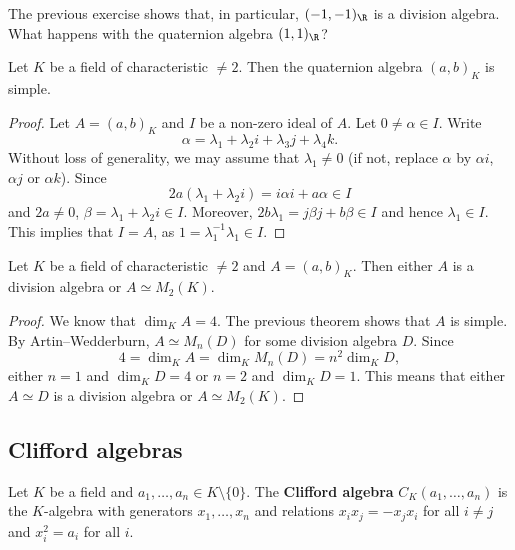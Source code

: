 The previous exercise shows that, in particular, $(-1,-1)_{\R}$ is a division algebra. 
What happens with the quaternion algebra $(1,1)_{\R}$?

\begin{theorem}
    Let $K$ be a field of characteristic $\ne2$. Then the quaternion algebra
    $(a,b)_K$ is simple. 
\end{theorem}

\begin{proof}
    Let $A=(a,b)_K$ and $I$ be a non-zero ideal of $A$. Let $0\ne\alpha\in I$. 
    Write 
    \[
    \alpha=\lambda_1+\lambda_2i+\lambda_3j+\lambda_4k.
    \]
    Without loss of generality, 
    we may assume that $\lambda_1\ne 0$ (if not, replace $\alpha$ by $\alpha i$, $\alpha j$ or 
    $\alpha k$). Since 
    \[
    2a(\lambda_1+\lambda_2 i)=i\alpha i+a\alpha\in I
    \]
    and $2a\ne 0$, $\beta=\lambda_1+\lambda_2 i\in I$. Moreover, 
    $2b\lambda_1=j\beta j+b\beta\in I$ and hence $\lambda_1\in I$. This implies
    that $I=A$, as $1=\lambda_1^{-1}\lambda_1\in I$. 
\end{proof}

\begin{corollary}
    Let $K$ be a field of characteristic $\ne2$ and $A=(a,b)_K$. 
    Then either $A$ is a division algebra or $A\simeq M_2(K)$. 
\end{corollary}

\begin{proof}
    We know that $\dim_KA=4$. The previous theorem shows that 
    $A$ is simple. By Artin--Wedderburn, $A\simeq M_n(D)$ for some 
    division algebra $D$. Since 
    \[
    4=\dim_KA=\dim_KM_n(D)=n^2\dim_KD,
    \]
    either $n=1$ and $\dim_KD=4$ or $n=2$ and $\dim_KD=1$. This means
    that either $A\simeq D$ is a division algebra or $A\simeq M_2(K)$. 
\end{proof}

\subsection{Clifford algebras}

\begin{definition}
    Let $K$ be a field and $a_1,\dots,a_n\in K\setminus\{0\}$. 
    The \textbf{Clifford algebra} $C_K(a_1,\dots,a_n)$ 
    is the $K$-algebra with generators $x_1,\dots,x_n$ and relations
    $x_ix_j=-x_jx_i$ for all $i\ne j$ and $x_i^2=a_i$ for all $i$. 
\end{definition}

